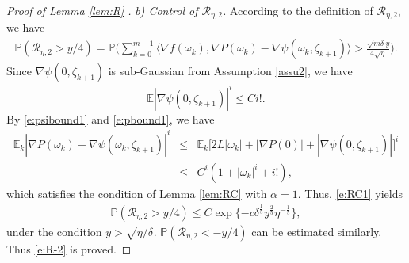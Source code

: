 \documentclass[12pt]{amsart}
\theoremstyle{definition}
\theoremstyle{remark}
\numberwithin{equation}{section}
\newcommand{\E}{\mathbb{E}}            %
\newcommand{\Ll}{\langle}
\newcommand{\Rr}{\rangle}
\newcommand{\PP}{\mathbb{P}}
\begin{document}
\begin{proof}[Proof of Lemma \ref{lem:R} ]
	\textit{b) Control of $\mathcal{R}_{\eta,2}$.}
	According to the definition of $\mathcal{R}_{\eta,2}$, we have
	\begin{eqnarray*}
		\PP\left(\mathcal{R}_{\eta,2}>y/4\right)	
		= \PP\Big(  \sum_{k=0}^{m-1}\Ll \nabla f(\omega_k),\nabla P(\omega_k)-\nabla\psi(\omega_k,\zeta_{k+1})\Rr >\frac{\sqrt{m\delta}y}{4\sqrt\eta} \Big).
	\end{eqnarray*}
	Since $\nabla\psi(0,\zeta_{k+1})$ is sub-Gaussian from Assumption \ref{assu2}, we have
	$$ \E|\nabla\psi(0,\zeta_{k+1})|^i\le Ci!.
	$$
	By \eqref{e:psibound1} and \eqref{e:pbound1}, we have	
	\begin{eqnarray*}
		\E_{k}|\nabla P(\omega_{k})-\nabla\psi(\omega_{k},\zeta_{k+1})|^i
		&\le& \E_k\big[2L|\omega_k|+|\nabla P(0)|+|\nabla \psi(0,\zeta_{k+1})| \big]^i\\
		&\le& C^i(1+|\omega_k|^i+i!),
	\end{eqnarray*}
	which satisfies the condition of Lemma \ref{lem:RC} with $\alpha=1$. Thus, \eqref{e:RC1} yields
	\begin{eqnarray*}
		\PP\left(\mathcal{R}_{\eta,2}>y/4\right)	\le C\exp\{-c\delta^\frac15 y^\frac25\eta^{-\frac1{5}}\},
	\end{eqnarray*}
	under the condition $y>\sqrt{\eta/\delta}$.
	$\PP\left(\mathcal{R}_{\eta,2}<-y/4\right)$ can be estimated similarly. Thus \eqref{e:R-2} is proved.
	

\end{proof}
\end{document}
